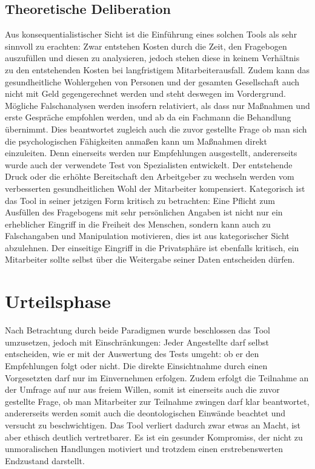 \documentclass[a4paper,12pt,]{article}
\begin{document}
\subsection{Theoretische Deliberation}
Aus konsequentialistischer Sicht ist die Einführung eines solchen Tools als sehr sinnvoll zu erachten: Zwar entstehen Kosten durch die Zeit, den Fragebogen auszufüllen und diesen zu analysieren, jedoch stehen diese in keinem Verhältnis zu den entstehenden Kosten bei langfristigem Mitarbeiterausfall. Zudem kann das gesundheitliche Wohlergehen von Personen und der gesamten Gesellschaft auch nicht mit Geld gegengerechnet werden und steht deswegen im Vordergrund. Mögliche Falschanalysen werden insofern relativiert, als dass nur Maßnahmen und erste Gespräche empfohlen werden, und ab da ein Fachmann die Behandlung übernimmt. Dies beantwortet zugleich auch die zuvor gestellte Frage ob man sich die psychologischen Fähigkeiten anmaßen kann um Maßnahmen direkt einzuleiten. Denn einerseits werden nur Empfehlungen ausgestellt, andererseits wurde auch der verwendete Test von Spezialisten entwickelt. Der entstehende Druck oder die erhöhte Bereitschaft den Arbeitgeber zu wechseln werden vom verbesserten gesundheitlichen Wohl der Mitarbeiter kompensiert.
Kategorisch ist das Tool in seiner jetzigen Form kritisch zu betrachten: Eine Pflicht zum Ausfüllen des Fragebogens mit sehr persönlichen Angaben ist nicht nur ein erheblicher Eingriff in die Freiheit des Menschen, sondern kann auch zu Falschangaben und Manipulation motivieren, dies ist aus kategorischer Sicht abzulehnen. Der einseitige Eingriff in die Privatsphäre ist ebenfalls kritisch, ein Mitarbeiter sollte selbst über die Weitergabe seiner Daten entscheiden dürfen.

\section{Urteilsphase}

Nach Betrachtung durch beide Paradigmen wurde beschlossen das Tool umzusetzen, jedoch mit Einschränkungen: Jeder Angestellte darf selbst entscheiden, wie er mit der Auswertung des Tests umgeht: ob er den Empfehlungen folgt oder nicht. Die direkte Einsichtnahme durch einen Vorgesetzten darf nur im Einvernehmen erfolgen. Zudem erfolgt die Teilnahme an der Umfrage auf nur aus freiem Willen, somit ist einerseits auch die zuvor gestellte Frage, ob man Mitarbeiter zur Teilnahme zwingen darf klar beantwortet, andererseits werden somit auch die deontologischen Einwände beachtet und versucht zu beschwichtigen. Das Tool verliert dadurch zwar etwas an Macht, ist aber ethisch deutlich vertretbarer. Es ist ein gesunder Kompromiss, der nicht zu unmoralischen Handlungen motiviert und trotzdem einen erstrebenswerten Endzustand darstellt.
\end{document}
